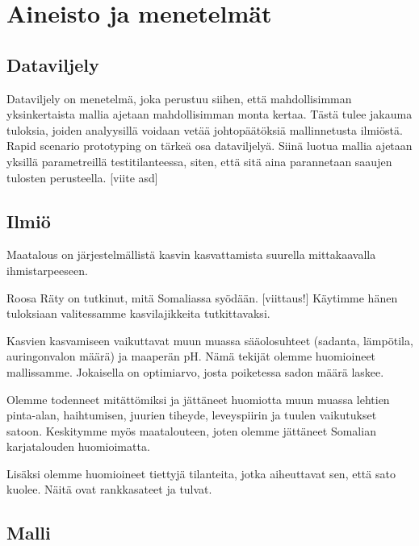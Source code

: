 \documentclass[12pt]{scrreprt}
\begin{document}
  
  \chapter{Aineisto ja menetelmät}
  
  \section{Dataviljely}
  
  Dataviljely on menetelmä, joka perustuu siihen, että mahdollisimman yksinkertaista
  mallia ajetaan mahdollisimman monta kertaa. Tästä tulee jakauma tuloksia, joiden
  analyysillä voidaan vetää johtopäätöksiä mallinnetusta ilmiöstä. \cite{assimple}
  Rapid scenario prototyping on tärkeä osa dataviljelyä. Siinä luotua mallia ajetaan
  yksillä parametreillä testitilanteessa, siten, että sitä aina parannetaan saaujen
  tulosten perusteella. [viite asd]

  \section{Ilmiö}

  Maatalous on järjestelmällistä kasvin kasvattamista suurella mittakaavalla
  ihmistarpeeseen.


  Roosa Räty on tutkinut, mitä Somaliassa syödään. [viittaus!] Käytimme hänen
  tuloksiaan valitessamme kasvilajikkeita tutkittavaksi.
  
  Kasvien kasvamiseen vaikuttavat muun muassa sääolosuhteet (sadanta, lämpötila,
  auringonvalon määrä) ja maaperän pH. Nämä tekijät olemme huomioineet
  mallissamme. Jokaisella on optimiarvo, josta poiketessa sadon määrä laskee.

  Olemme todenneet mitättömiksi ja jättäneet huomiotta muun muassa lehtien
  pinta-alan, haihtumisen, juurien tiheyde, leveyspiirin ja tuulen vaikutukset
  satoon. Keskitymme myös maatalouteen, joten olemme jättäneet Somalian
  karjatalouden huomioimatta.
  
  Lisäksi olemme huomioineet tiettyjä tilanteita, jotka aiheuttavat sen, että
  sato kuolee. Näitä ovat rankkasateet ja tulvat.
  
  \section{Malli}
\end{document}
